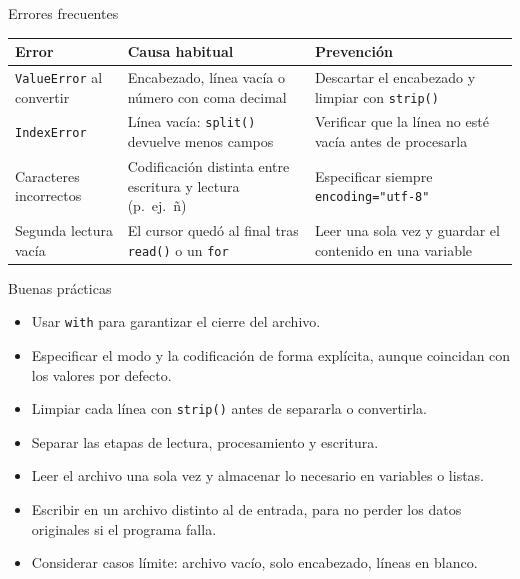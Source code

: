 \documentclass{beamer}
\begin{document}
    \begin{frame}[fragile, t]{Errores frecuentes}
        \renewcommand{\arraystretch}{1.25}
        \begin{center}
            \scriptsize
            \begin{tabular}{@{}p{2.6cm}p{3.6cm}p{4.2cm}@{}}
                \toprule
                \textbf{Error} & \textbf{Causa habitual} & \textbf{Prevención} \\
                \midrule
                \texttt{ValueError} al convertir &
                Encabezado, línea vacía o número con coma decimal &
                Descartar el encabezado y limpiar con \texttt{strip()} \\
                \texttt{IndexError} &
                Línea vacía: \texttt{split()} devuelve menos campos &
                Verificar que la línea no esté vacía antes de procesarla \\
                Caracteres incorrectos &
                Codificación distinta entre escritura y lectura (p.\ ej.\ ñ) &
                Especificar siempre \texttt{encoding="utf-8"} \\
                Segunda lectura vacía &
                El cursor quedó al final tras \texttt{read()} o un \texttt{for} &
                Leer una sola vez y guardar el contenido en una variable \\
                \bottomrule
            \end{tabular}
        \end{center}
    \end{frame}

    \begin{frame}[fragile, t]{Buenas prácticas}
        \begin{itemize}
            \item Usar \texttt{with} para garantizar el cierre del archivo.
            \item Especificar el modo y la codificación de forma explícita, aunque coincidan con los valores por defecto.
            \item Limpiar cada línea con \texttt{strip()} antes de separarla o convertirla.
            \item Separar las etapas de lectura, procesamiento y escritura.
            \item Leer el archivo una sola vez y almacenar lo necesario en variables o listas.
            \item Escribir en un archivo distinto al de entrada, para no perder los datos originales si el programa falla.
            \item Considerar casos límite: archivo vacío, solo encabezado, líneas en blanco.
        \end{itemize}
    \end{frame}
\end{document}
